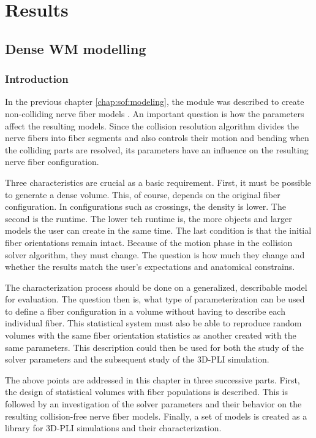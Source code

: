 \newpage\null\thispagestyle{empty}\newpage
\clearpage{\thispagestyle{empty}\cleardoublepage}
\part{Results}
\parttoc
% 
% 
% 
\setcounter{chapter}{6}
\chapter{Dense \acs{WM} modelling}
\label{cha:model_analysis}
%
% 
\section{Introduction}
%
In the previous chapter \cref{chap:sof:modeling}, the module  was described to create non-colliding nerve fiber models \cite{Matuschke2019, Matuschke2021}.
An important question is how the parameters affect the resulting models.
Since the collision resolution algorithm divides the nerve fibers into fiber segments and also controls their motion and bending when the colliding parts are resolved, its parameters have an influence on the resulting nerve fiber configuration.
\par
%
Three characteristics are crucial as a basic requirement.
First, it must be possible to generate a dense volume.
This, of course, depends on the original fiber configuration.
In configurations  such as crossings, the density is lower.
The second is the runtime.
The lower teh runtime is, the more objects and larger models the user can create in the same time.
The last condition is that the initial fiber orientations remain intact.
Because of the motion phase in the collision solver algorithm, they must change.
The question is how much they change and whether the results match the user's expectations and anatomical constrains.
\par
%
The characterization process should be done on a generalized, describable model for evaluation.
The question then is, what type of parameterization can be used to define a fiber configuration in a volume without having to describe each individual fiber.
This statistical system must also be able to reproduce random volumes with the same fiber orientation statistics as another created with the same parameters.
This description could then be used for both the study of the solver parameters and the subsequent study of the \ac{3D-PLI} simulation.
\par
%
The above points are addressed in this chapter in three successive parts.
First, the design of statistical volumes with fiber populations is described.
This is followed by an investigation of the solver parameters and their behavior on the resulting collision-free nerve fiber models.
Finally, a set of models is created as a library for \ac{3D-PLI} simulations and their characterization.
%
%
%
